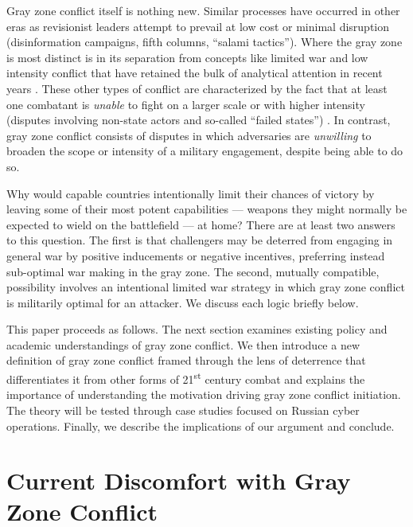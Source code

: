 \documentclass[12pt,letterpaper]{article}
\begin{document}
	Gray zone conflict itself is nothing new. Similar processes have occurred in other eras as revisionist leaders attempt to prevail at low cost or minimal disruption (disinformation campaigns, fifth columns, ``salami tactics'').  Where the gray zone is most distinct is in its separation from concepts like limited war and low intensity conflict that have retained the bulk of analytical attention in recent years \citep{charap_ghosthybridwar_2015, freedman_ukraineartlimited_2014, freysinger_usmilitaryeconomic_1991, grant_strategicdecisionsmire_1991, lepgold_whenstatesfight_2000, metz_foundationlowintensity_1989, powell_nuclearbrinkmanshiplimited_2015, rosen_vietnamamericantheory_1982, schelling_bargainingcommunicationlimited_1957, sullivan_waraimswar_2007, turbiville_prefacefuturetrends_2002}. These other types of conflict are characterized by the fact that at least one combatant is \textit{unable} to fight on a larger scale or with higher intensity (disputes involving non-state actors and so-called ``failed states'') \citep{hoffman_currentresearchterrorism_1992}. In contrast, gray zone conflict consists of disputes in which adversaries are \textit{unwilling} to broaden the scope or intensity of a military engagement, despite being able to do so.  
	
	Why would capable countries intentionally limit their chances of victory by leaving some of their most potent capabilities --- weapons they might normally be expected to wield on the battlefield --- at home? There are at least two answers to this question.  The first is that challengers may be deterred from engaging in general war by positive inducements or negative incentives, preferring instead sub-optimal war making in the gray zone. The second, mutually compatible, possibility involves an intentional limited war strategy in which gray zone conflict is militarily optimal for an attacker. We discuss each logic briefly below. 
	
	This paper proceeds as follows. The next section examines existing policy and academic understandings of gray zone conflict. We then introduce a new definition of gray zone conflict framed through the lens of deterrence that differentiates it from other forms of 21\textsuperscript{st} century combat and explains the importance of understanding the motivation driving gray zone conflict initiation. The theory will be tested through case studies focused on Russian cyber operations. Finally, we describe the implications of our argument and conclude.

\section{Current Discomfort with Gray Zone Conflict}
\end{document}
